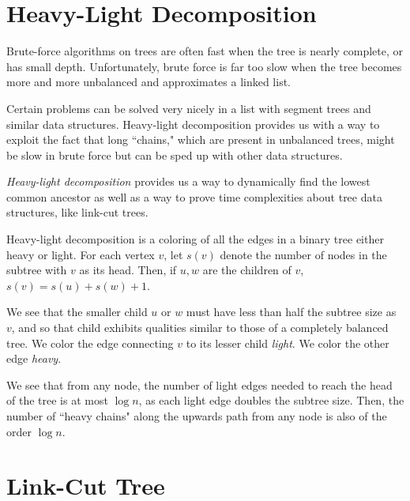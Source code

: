 \section{Heavy-Light Decomposition}

Brute-force algorithms on trees are often fast when the tree is nearly complete, or has small depth. Unfortunately, brute force is far too slow when the tree becomes more and more unbalanced and approximates a linked list.

Certain problems can be solved very nicely in a list with segment trees and similar data structures. Heavy-light decomposition provides us with a way to exploit the fact that long ``chains," which are present in unbalanced trees, might be slow in brute force but can be sped up with other data structures.

\textit{Heavy-light decomposition} provides us a way to dynamically find the lowest common ancestor as well as a way to prove time complexities about tree data structures, like link-cut trees. 

Heavy-light decomposition is a coloring of all the edges in a binary tree either heavy or light. For each vertex $v$, let $s(v)$ denote the number of nodes in the subtree with $v$ as its head. Then, if $u,w$ are the children of $v$, $s(v)=s(u)+s(w)+1$.

We see that the smaller child $u$ or $w$ must have less than half the subtree size as $v$, and so that child exhibits qualities similar to those of a completely balanced tree. We color the edge connecting $v$ to its lesser child \textit{light}. We color the other edge \textit{heavy}.

We see that from any node, the number of light edges needed to reach the head of the tree is at most $\log{n}$, as each light edge doubles the subtree size. Then, the number of ``heavy chains" along the upwards path from any node is also of the order $\log{n}$.

\begin{center}
\end{center}

\section{Link-Cut Tree}

